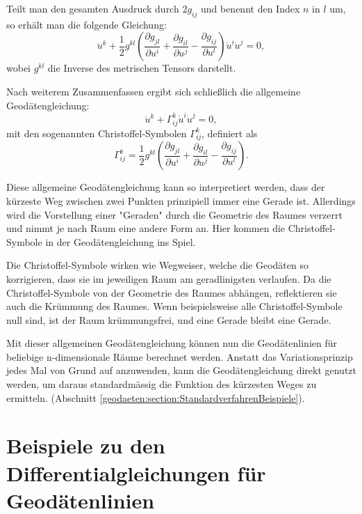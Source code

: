 Teilt man den gesamten Ausdruck durch $2g_{ij}$ und benennt den Index $n$ in $l$ um, so erhält man die folgende Gleichung:
\begin{equation}
	\ddot{u}^k + \frac{1}{2} g^{kl} \left( \frac{\partial g_{jl}}{\partial u^i} + \frac{\partial g_{il}}{\partial u^j} - \frac{\partial g_{ij}}{\partial u^l} \right) \dot{u}^i \dot{u}^j = 0,
\end{equation}
wobei $g^{kl}$ die Inverse des metrischen Tensors darstellt.

Nach weiterem Zusammenfassen ergibt sich schließlich die allgemeine Geodätengleichung:
\begin{equation} 
	\ddot{u}^k + \Gamma^k_{ij} \dot{u}^i \dot{u}^j = 0, 
\end{equation}
mit den sogenannten Christoffel-Symbolen $\Gamma^k_{ij}$, definiert als
\begin{equation} 
	\Gamma^k_{ij} = \frac{1}{2} g^{kl} \left( \frac{\partial g_{jl}}{\partial u^i} + \frac{\partial g_{il}}{\partial u^j} - \frac{\partial g_{ij}}{\partial u^l} \right).
\end{equation}

Diese allgemeine Geodätengleichung kann so interpretiert werden, dass der kürzeste Weg zwischen zwei Punkten prinzipiell immer eine Gerade ist. 
Allerdings wird die Vorstellung einer "Geraden" durch die Geometrie des Raumes verzerrt und nimmt je nach Raum eine andere Form an. 
Hier kommen die Christoffel-Symbole in der Geodätengleichung ins Spiel.

Die Christoffel-Symbole wirken wie Wegweiser, welche die Geodäten so korrigieren, dass sie im jeweiligen Raum am geradlinigsten verlaufen. 
Da die Christoffel-Symbole von der Geometrie des Raumes abhängen, reflektieren sie auch die Krümmung des Raumes.
Wenn beispielsweise alle Christoffel-Symbole null sind, ist der Raum krümmungsfrei, und eine Gerade bleibt eine Gerade.

Mit dieser allgemeinen Geodätengleichung können nun die Geodätenlinien für beliebige n-dimensionale Räume berechnet werden. 
Anstatt das Variationsprinzip jedes Mal von Grund auf anzuwenden, kann die Geodätengleichung direkt genutzt werden, um daraus standardmässig die Funktion des kürzesten Weges zu ermitteln. (Abschnitt \ref{geodaeten:section:StandardverfahrenBeispiele}).

\section{Beispiele zu den Differentialgleichungen für Geodätenlinien 
\label{geodaeten:section:StandardverfahrenBeispiele}}




